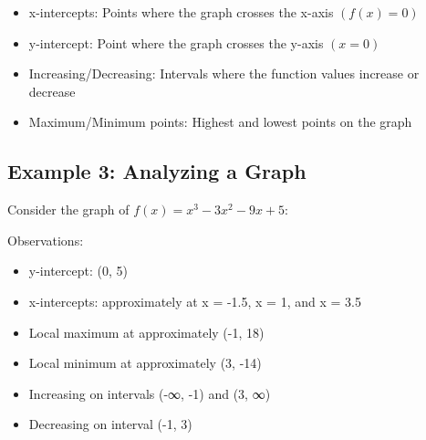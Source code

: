 \documentclass[12pt]{article}
\begin{document}
\begin{itemize}
    \item x-intercepts: Points where the graph crosses the x-axis $(f(x) = 0)$
    \item y-intercept: Point where the graph crosses the y-axis $(x = 0)$
    \item Increasing/Decreasing: Intervals where the function values increase or decrease
    \item Maximum/Minimum points: Highest and lowest points on the graph
\end{itemize}

\subsection{Example 3: Analyzing a Graph}

Consider the graph of $f(x) = x^3 - 3x^2 - 9x + 5$:

\begin{center}
\end{center}

Observations:
\begin{itemize}
    \item y-intercept: (0, 5)
    \item x-intercepts: approximately at x = -1.5, x = 1, and x = 3.5
    \item Local maximum at approximately (-1, 18)
    \item Local minimum at approximately (3, -14)
    \item Increasing on intervals (-∞, -1) and (3, ∞)
    \item Decreasing on interval (-1, 3)
\end{itemize}
\end{document}
